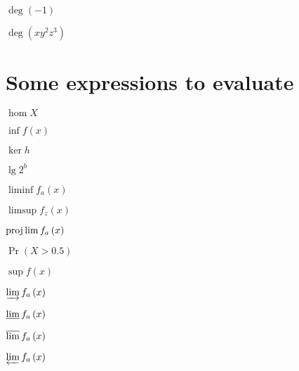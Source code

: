 \documentclass{article}
\begin{document}
$\deg \left( -1\right) $

$\deg \left( xy^{2}z^{3}\right) $

\section{Some expressions to evaluate}

$\hom X$

$\inf f\left( x\right) $

$\ker h$

$\lg 2^{b}$

$\liminf f_{a}\left( x\right) $

$\limsup f_{z}\left( x\right) $

$\projlim f_{a}\left( x\right) $

$\Pr \left( X>0.5\right) $

$\sup f\left( x\right) $

$\varinjlim f_{a}\left( x\right) $

$\varliminf f_{a}\left( x\right) $

$\varlimsup f_{a}\left( x\right) $

$\varprojlim f_{a}\left( x\right) $
\end{document}
